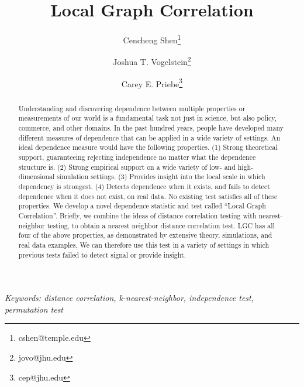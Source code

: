 \documentclass[11pt]{article}
\begin{document}
\def\spacingset#1{\renewcommand{\baselinestretch}%
{#1}\small\normalsize} \spacingset{1}

\title{\bf Local Graph Correlation}
\author[1]{Cencheng Shen\thanks{cshen@temple.edu}}
\author[2]{Joshua T. Vogelstein\thanks{jovo@jhu.edu}}
\author[3]{Carey E. Priebe\thanks{cep@jhu.edu}}
\maketitle


\bigskip
\begin{abstract}
Understanding and discovering dependence between multiple properties or measurements of our world is a fundamental task not just in science, but also policy, commerce, and other domains. In the past hundred years, people have developed many different measures of dependence that can be applied in a wide variety of settings.  An ideal dependence measure would have the following properties. (1) Strong theoretical support, guaranteeing rejecting independence no matter what the dependence structure is. (2) Strong empirical support on a wide variety of low- and high-dimensional simulation settings. (3) Provides insight into the local scale in which dependency is strongest. (4) Detects dependence when it exists, and fails to detect dependence when it does not exist, on real data. No existing test satisfies all of these properties. We develop a novel dependence statistic and test called ``Local Graph Correlation''.  Briefly, we combine the ideas of distance correlation testing with nearest-neighbor testing, to obtain a nearest neighbor distance correlation test.  LGC has all four of the above properties, as demonstrated by extensive theory, simulations, and real data examples. We can therefore use this test in a variety of settings in which previous tests failed to detect signal or provide insight.
\end{abstract}

\noindent%
{\it Keywords: distance correlation, k-nearest-neighbor, independence test, permutation test}  
\vfill

\tableofcontents


\newpage
\spacingset{1.45}
\end{document}
